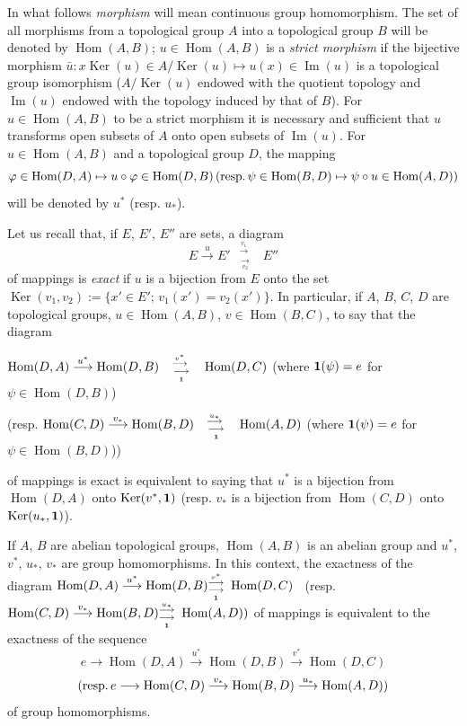 \documentclass[12pt]{amsart}
\theoremstyle{theorem}
\theoremstyle{definition}
\theoremstyle{remark} \theoremstyle{question} \theoremstyle{example}
\def\vr{{\varphi}}
\def\Hom{\operatorname{{Hom}}}
\def\Ker{\operatorname{{Ker}}}
\def\mI{\operatorname{{Im}}}
\begin{document}
In what follows \textit{morphism\/} will mean continuous group homomorphism.
The set of all morphisms from a topological group $A$ into a topological
group $B$ will be denoted by $\Hom(A,B)$; $u \in \Hom(A,B)$ is a
\textit{strict morphism\/} \cite[p.\ 30]{Bourbaki0} if the bijective morphism
$\bar{u}\colon x\Ker(u) \in A/\Ker(u) \mapsto u(x) \in \mI(u)$ is a
topological group isomorphism ($A/\Ker(u)$ endowed with the quotient
topology and $\mI(u)$ endowed with the topology induced by that of $B$).
For $u \in \Hom(A,B)$ to be a strict morphism it is necessary and sufficient
that $u$ transforms open subsets of $A$ onto open subsets of $\mI(u)$.
For $u \in \Hom(A,B)$ and a topological group $D$, the mapping
$$
\vr \in \Hom(D,A) \mapsto u\circ\vr \in \Hom(D,B)\,
({\rm resp.}\, \psi \in \Hom(B,D) \mapsto \psi \circ u \in \Hom(A,D))
$$
will be denoted by $u^*$ (resp. $u_*$).

Let us recall \cite[p.\ 301]{Grothendieck2} that, if $E$, $E'$, $E''$ are sets,
a diagram
$$
E \overset{u}{\longrightarrow} E'^{\quad\overset{v_1}{\longrightarrow}}_{\quad\,\underset{v_2}{\longrightarrow}}\quad E''
$$
of mappings is {\it exact\/} if $u$ is a bijection from $E$ onto the set
$\Ker(v_1,v_2) := \{x' \in E';\, v_1(x') = v_2(x')\}$. In particular,
if $A$, $B$, $C$, $D$ are topological groups, $u \in \Hom(A,B)$,
$v \in \Hom(B,C)$, to say that the diagram

\noindent $\Hom(D,A) \overset{u^*}{\longrightarrow} \Hom(D,B)^{\quad\overset{v^*}{\longrightarrow}}_{\quad\,\underset{\bf 1}{\longrightarrow}} \quad \Hom(D,C)$ (where ${\bf 1}(\psi)=e$ for $\psi \in \Hom(D,B)$)

\noindent({\rm resp.} $\Hom(C,D) \overset{v_*}{\longrightarrow} \Hom(B,D)^{\quad\overset{u_*}{\longrightarrow}}_{\quad\,\underset{\bf 1}{\longrightarrow}} \quad \Hom(A,D)$ (where ${\bf 1}(\psi)=e$ for $\psi \in \Hom(B,D)$))

\noindent of mappings is exact is equivalent to saying that $u^*$ is a
bijection from $\Hom(D,A)$ onto $\Ker(v^*,{\bf 1})$
(resp. $v_*$ is a bijection from $\Hom(C,D)$ onto $\Ker(u_*,\bf 1)$).

If $A$, $B$ are abelian topological groups, $\Hom(A,B)$ is an abelian group
and $u^*$, $v^*$, $u_*$, $v_*$ are group homomorphisms. In this context,
the exactness of the diagram
$\Hom(D,A) \overset{u^*}{\longrightarrow} \Hom(D,B)^{\overset{v^*}{\longrightarrow}}_{\underset{\bf 1}{\longrightarrow}} \,\, \Hom(D,C)$ \,
(resp. $\Hom(C,D) \overset{v_*}{\longrightarrow}\Hom(B,D)^{\overset{u_*}{\longrightarrow}}_{\underset{\bf 1}{\longrightarrow}} \,\,\Hom(A,D))$
of mappings is equivalent to the exactness of the sequence
$$
e \longrightarrow \Hom(D,A)\overset{u^*}{\longrightarrow} \Hom(D,B)
\overset{v^*}{\longrightarrow} \Hom(D,C)
$$
$$
({\rm resp.}\, e \longrightarrow \Hom(C,D) \overset{v_*}{\longrightarrow}\Hom(B,D)\overset{u_*}{\longrightarrow}\Hom(A,D))
$$
of group homomorphisms.
\end{document}

